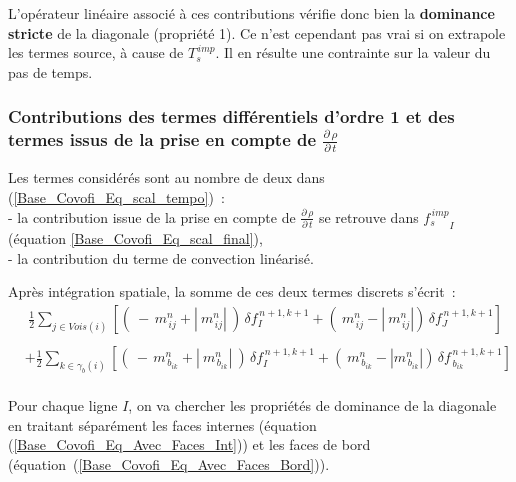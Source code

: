 L'opérateur linéaire associé à ces contributions
vérifie donc bien la {\bf dominance stricte} de la diagonale (propriété
1). Ce n'est cependant pas vrai si on extrapole les termes source, à cause de
$T_s^{\,imp}$. Il en résulte une contrainte sur la valeur du pas de temps.

%
\subsubsection*{Contributions  des termes
différentiels d'ordre 1 et des termes issus de la prise en compte de
$\displaystyle \frac {{\partial}\,\rho}{{\partial}\,t}$}
\label{Base_Covofi_Contributionsdrhodtconvection}
Les termes considérés sont au nombre de deux dans
(\ref{Base_Covofi_Eq_scal_tempo})~:\\
\hspace*{1cm}- la contribution issue de la prise en compte de $\displaystyle
\frac
{{\partial}\,\rho}{{\partial}\,t}$ se retrouve dans ${f_s^{\,imp}}_I $
(équation \ref{Base_Covofi_Eq_scal_final}),\\
\hspace*{1cm}- la contribution du terme de convection
linéarisé.


Après intégration spatiale, la somme de ces deux termes discrets s'écrit~:\\
\begin{equation}
\begin{array}{lll}\label{Base_Covofi_Eq_Avec_Faces_Int}
&\displaystyle \frac{1}{2}\sum\limits_{j\in Vois(i)}\left[(\ -\,m_{\,ij}^n + |\
m_{\,ij}^n|\ )\,\delta f_I^{\,n+1,k+1}+ (\ m_{\,ij}^n - |\ m_{\,ij}^n|)\,\delta f_J^{\,n+1,k+1}\right]\\
\end{array}
\end{equation}
\begin{equation}\label{Base_Covofi_Eq_Avec_Faces_Bord}
\begin{array}{lll}
&+\displaystyle\frac{1}{2}\sum\limits_{k\in {\gamma_b(i)}}\left[(\ -\,
m_{\,{b}_{ik}}^n + |\ m_{\,{b}_{ik}}^n|\ )\,\delta f_I^{\,n+1,k+1} + (\
m_{\,{b}_{ik}}^n - |m_{\,{b}_{ik}}^n|)\,\delta f_{\,{b}_{ik}}^{\,n+1,k+1}\right]\\
\end{array}
\end{equation}

Pour chaque ligne $I$, on va chercher les propriétés de dominance de la
diagonale en traitant séparément les faces internes (équation
(\ref{Base_Covofi_Eq_Avec_Faces_Int})) et les faces de bord
(équation~(\ref{Base_Covofi_Eq_Avec_Faces_Bord})).

